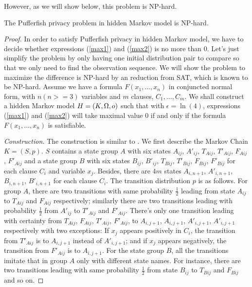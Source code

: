 However, as we will show below, this problem is NP-hard.

\begin{theorem}
  The Pufferfish privacy problem in hidden Markov model is NP-hard.
\end{theorem}

\begin{proof}
  In order to satisfy Pufferfish privacy in hidden Markov model, we have to decide whether
  expressions (\ref{max1}) and (\ref{max2}) is no more than $0$.
  Let's just simplify the problem by only having one initial distribution pair to compare
  so that we only need to find the observation sequence.
  We will show the problem to maximize the difference is NP-hard by
  an reduction from SAT, which is known to be NP-hard. Assume we have a formula $F(x_1,\ldots,x_n)$ in conjuncted normal form,
  with $n(n>=3)$ variables and $m$ clauses, $C_1,\ldots,C_m$. We shall construct a hidden Markov model $H = (K, \Omega, o)$
  such that with $\epsilon = \ln(4)$, expressions (\ref{max1}) and (\ref{max2}) will take maximal value $0$
  if and only if the formula $F(x_1,\ldots,x_n)$ is satisfiable.

  \textit{Construction.} The construction is similar to \cite{PCT:87:CMDP}. We first describe the Markov Chain $K =
  (S, p)$. $S$ contains a state group $A$ with six states $A_{ij}$, $A'_{ij}$, $T_{A ij}$, $T'_{Aij}$, $F_{Aij}$, $F'_{Aij}$ and
  a state group $B$ with six states $B_{ij}$, $B'_{ij}$, $T_{Bij}$, $T'_{Bij}$, $F_{Bij}$, $F'_{Bij}$
  for each clause $C_i$ and variable $x_j$. Besides, there are $4m$ states $A_{i,n+1}$, $A'_{i,n+1}$, $B_{i,n+1}$, $B'_{i,n+1}$ for each clause $C_i$.
  The transition distribution $p$ is as follows. For group $A$, there are two transitions with same probability $\frac{1}{2}$ leading from
  state $A_{ij}$ to $T_{Aij}$ and $F_{Aij}$ respectively; similarly there are two transitions leading with probability $\frac{1}{2}$
  from $A'_{ij}$ to $T'_{Aij}$ and $F'_{Aij}$. There's only one transition leading with certainty from $T_{Aij}$, $F_{Aij}$, $T'_{Aij}$, $F'_{Aij}$,
  to $A_{i,j+1}$, $A_{i,j+1}$, $A'_{i,j+1}$, $A'_{i,j+1}$ respectively with two exceptions: If $x_j$ appears positively in $C_i$,
  the transition from $T'_{Aij}$ is to $A_{i,j+1}$ instead of $A'_{i,j+1}$; and if $x_j$ appears negatively, the transition from
  $F'_{Aij}$ is to $A_{i,j+1}$. For the state group $B$, all the transitions imitate that in group $A$ only with different state names.
  For instance, there are two transitions leading with same probability $\frac{1}{2}$ from state $B_{ij}$ to $T_{Bij}$ and $F_{Bij}$ and so on.


\end{proof}
